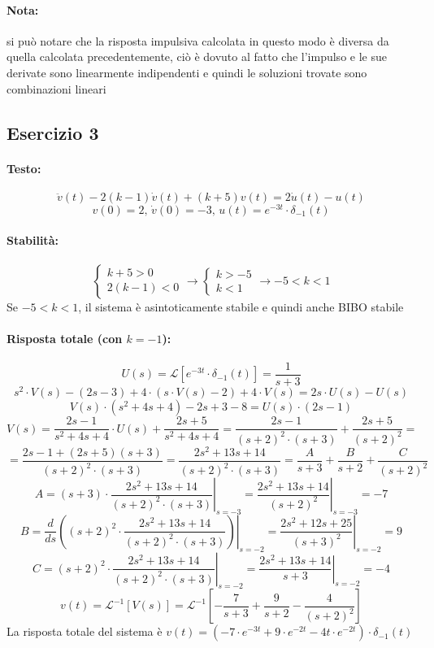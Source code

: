 \documentclass[a4paper,oneside,titlepage]{book}
\begin{document}
\paragraph{Nota:}
si può notare che la risposta impulsiva calcolata in questo modo è diversa da quella calcolata precedentemente, ciò è dovuto al fatto che l'impulso e le sue derivate sono linearmente indipendenti e quindi le soluzioni trovate sono combinazioni lineari 


\newpage
\subsection{Esercizio 3}
\paragraph{Testo:}
\[ \ddot{v}(t) - 2(k-1) \dot{v}(t) + (k+5) v(t) = 2 \dot{u}(t) - u(t) \]
\[ v(0) = 2, \, \dot{v}(0) = -3, \, u(t) = e^{-3t} \cdot \delta_{-1}(t) \]

\paragraph{Stabilità:}
\[
\begin{cases}
k+5 > 0 \\
2(k-1) < 0
\end{cases}
\longrightarrow
\begin{cases}
k > -5 \\
k < 1
\end{cases}
\longrightarrow
-5 < k < 1
\]
Se $-5 < k < 1$, il sistema è asintoticamente stabile e quindi anche BIBO stabile

\paragraph{Risposta totale (con $k=-1$):}
\[ U(s) = \mathcal{L} \left[ e^{-3t} \cdot \delta_{-1}(t) \right] = \frac{1}{s+3} \]
\[ s^2 \cdot V(s) - (2s - 3) + 4 \cdot (s \cdot V(s) - 2) + 4 \cdot V(s) = 2s \cdot U(s) - U(s) \]
\[ V(s) \cdot (s^2 + 4s + 4) - 2s + 3 - 8 = U(s) \cdot (2s - 1) \]
\[ V(s) = \frac{2s - 1}{s^2 + 4s + 4} \cdot U(s) + \frac{2s + 5}{s^2 + 4s + 4} = \frac{2s - 1}{(s+2)^2 \cdot (s+3)} + \frac{2s + 5}{(s+2)^2} = \]
\[
= \frac{2s-1 + (2s+5)(s+3)}{(s+2)^2 \cdot (s+3)}
= \frac{2s^2 + 13s + 14}{(s+2)^2 \cdot (s+3)}
= \frac{A}{s+3} + \frac{B}{s+2} + \frac{C}{(s+2)^2}
\]
\[ A = \left. (s+3) \cdot \frac{2s^2 + 13s + 14}{(s+2)^2 \cdot (s+3)} \right|_{s=-3} = \left. \frac{2s^2 + 13s + 14}{(s+2)^2} \right|_{s=-3} = -7 \]
\[ B = \frac{d}{ds} \left. \left( (s+2)^2 \cdot \frac{2s^2 + 13s + 14}{(s+2)^2 \cdot (s+3)} \right) \right|_{s=-2} = \left. \frac{2s^2 + 12s + 25}{(s+3)^2} \right|_{s=-2} = 9 \]
\[ C = \left. (s+2)^2 \cdot \frac{2s^2 + 13s + 14}{(s+2)^2 \cdot (s+3)} \right|_{s=-2} = \left. \frac{2s^2 + 13s + 14}{s+3} \right|_{s=-2} = -4 \]
\[ v(t) = \mathcal{L}^{-1} [V(s)] = \mathcal{L}^{-1} \left[- \frac{7}{s+3} + \frac{9}{s+2} - \frac{4}{(s+2)^2} \right] \]
La risposta totale del sistema è $v(t) = \left( -7 \cdot e^{-3t} + 9 \cdot e^{-2t} - 4t \cdot e^{-2t} \right) \cdot \delta_{-1}(t)$
\end{document}
